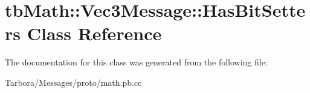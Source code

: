 \hypertarget{classtbMath_1_1Vec3Message_1_1HasBitSetters}{}\section{tb\+Math\+:\+:Vec3\+Message\+:\+:Has\+Bit\+Setters Class Reference}
\label{classtbMath_1_1Vec3Message_1_1HasBitSetters}


The documentation for this class was generated from the following file\+:\begin{DoxyCompactItemize}
\item 
Tarbora/\+Messages/proto/math.\+pb.\+cc\end{DoxyCompactItemize}
